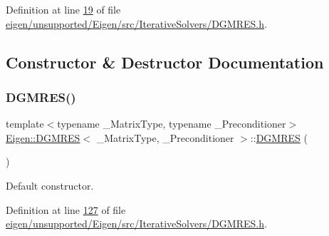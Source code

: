Definition at line \hyperlink{eigen_2unsupported_2_eigen_2src_2_iterative_solvers_2_d_g_m_r_e_s_8h_source_l00019}{19} of file \hyperlink{eigen_2unsupported_2_eigen_2src_2_iterative_solvers_2_d_g_m_r_e_s_8h_source}{eigen/unsupported/\+Eigen/src/\+Iterative\+Solvers/\+D\+G\+M\+R\+E\+S.\+h}.



\subsection{Constructor \& Destructor Documentation}
\mbox{\label{class_eigen_1_1_d_g_m_r_e_s_a17bd25826b56c39bc7cc4ce8fbf8a848}} 
\subsubsection{\texorpdfstring{D\+G\+M\+R\+E\+S()}{DGMRES()}\hspace{0.1cm}{\footnotesize\ttfamily [1/4]}}
{\footnotesize\ttfamily template$<$typename \+\_\+\+Matrix\+Type, typename \+\_\+\+Preconditioner$>$ \\
\hyperlink{class_eigen_1_1_d_g_m_r_e_s}{Eigen\+::\+D\+G\+M\+R\+ES}$<$ \+\_\+\+Matrix\+Type, \+\_\+\+Preconditioner $>$\+::\hyperlink{class_eigen_1_1_d_g_m_r_e_s}{D\+G\+M\+R\+ES} (\begin{DoxyParamCaption}{ }\end{DoxyParamCaption})\hspace{0.3cm}{\ttfamily [inline]}}

Default constructor. 

Definition at line \hyperlink{eigen_2unsupported_2_eigen_2src_2_iterative_solvers_2_d_g_m_r_e_s_8h_source_l00127}{127} of file \hyperlink{eigen_2unsupported_2_eigen_2src_2_iterative_solvers_2_d_g_m_r_e_s_8h_source}{eigen/unsupported/\+Eigen/src/\+Iterative\+Solvers/\+D\+G\+M\+R\+E\+S.\+h}.

\mbox{\label{class_eigen_1_1_d_g_m_r_e_s_a800fcf37c0ac66f76d5c070e4aeae2a7}} 
